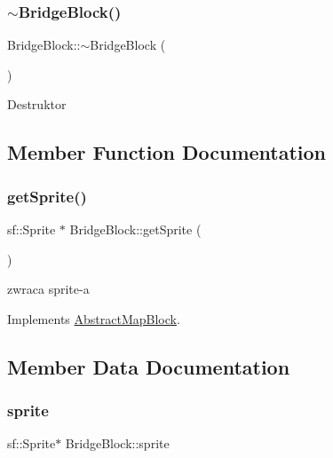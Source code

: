 \subsubsection{\texorpdfstring{$\sim$\+Bridge\+Block()}{~BridgeBlock()}}
{\footnotesize\ttfamily Bridge\+Block\+::$\sim$\+Bridge\+Block (\begin{DoxyParamCaption}{ }\end{DoxyParamCaption})}

Destruktor 

\subsection{Member Function Documentation}
\mbox{\label{class_bridge_block_a6ea5fa76b21c9805702c7f214e661198}} 
\subsubsection{\texorpdfstring{get\+Sprite()}{getSprite()}}
{\footnotesize\ttfamily sf\+::\+Sprite $\ast$ Bridge\+Block\+::get\+Sprite (\begin{DoxyParamCaption}{ }\end{DoxyParamCaption})\hspace{0.3cm}{\ttfamily [virtual]}}

zwraca sprite-\/a 

Implements \hyperlink{class_abstract_map_block_ab5a448a1b6478d10a8814c6d19c4fdb4}{Abstract\+Map\+Block}.



\subsection{Member Data Documentation}
\mbox{\label{class_bridge_block_a93817188870fb7eb4137a90a7025a748}} 
\subsubsection{\texorpdfstring{sprite}{sprite}}
{\footnotesize\ttfamily sf\+::\+Sprite$\ast$ Bridge\+Block\+::sprite\hspace{0.3cm}{\ttfamily [protected]}}

